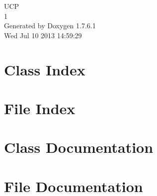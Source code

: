 \documentclass[a4paper]{book}
\begin{document}
\hypersetup{pageanchor=false,citecolor=blue}
\begin{titlepage}
\vspace*{7cm}
\begin{center}
{\Large \-U\-C\-P \\[1ex]\large 1 }\\
\vspace*{1cm}
{\large \-Generated by Doxygen 1.7.6.1}\\
\vspace*{0.5cm}
{\small Wed Jul 10 2013 14:59:29}\\
\end{center}
\end{titlepage}
\clearemptydoublepage
{}
\tableofcontents
\clearemptydoublepage
{}
\hypersetup{pageanchor=true,citecolor=blue}
\chapter{\-Class \-Index}

\chapter{\-File \-Index}

\chapter{\-Class \-Documentation}










\chapter{\-File \-Documentation}









\printindex
\end{document}
